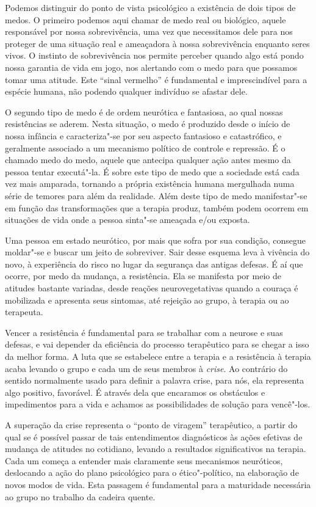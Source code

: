 Podemos distinguir do ponto de vista psicológico a existência de dois
tipos de medos. O primeiro podemos aqui chamar de medo real ou
biológico, aquele responsável por nossa sobrevivência, uma vez que
necessitamos dele para nos proteger de uma situação real e ameaçadora à
nossa sobrevivência enquanto seres vivos. O instinto de sobrevivência
nos permite perceber quando algo está pondo nossa garantia de vida em
jogo, nos alertando com o medo para que possamos tomar uma atitude. Este
``sinal vermelho'' é fundamental e imprescindível para a espécie humana,
não podendo qualquer indivíduo se afastar dele.

O segundo tipo de medo é de ordem neurótica e fantasiosa, ao qual nossas
resistências se aderem. Nesta situação, o medo é produzido desde o
início de nossa infância e caracteriza"-se por seu aspecto fantasioso e
catastrófico, e geralmente associado a um mecanismo político de controle
e repressão. É o chamado medo do medo, aquele que antecipa qualquer ação
antes mesmo da pessoa tentar executá"-la. É sobre este tipo de medo que a
sociedade está cada vez mais amparada, tornando a própria existência
humana mergulhada numa série de temores para além da realidade. Além
deste tipo de medo manifestar"-se em função das transformações que a
terapia produz, também podem ocorrem em situações de vida onde a pessoa
sinta"-se ameaçada e/ou exposta.

Uma pessoa em estado neurótico, por mais que sofra por sua condição,
consegue moldar"-se e buscar um jeito de sobreviver. Sair desse esquema
leva à vivência do novo, à experiência do risco no lugar da segurança
das antigas defesas. É aí que ocorre, por medo da mudança, a
resistência. Ela se manifesta por meio de atitudes bastante variadas,
desde reações neurovegetativas quando a couraça é mobilizada e apresenta
seus sintomas, até rejeição ao grupo, à terapia ou ao terapeuta.

Vencer a resistência é fundamental para se trabalhar com a neurose e
suas defesas, e vai depender da eficiência do processo terapêutico para
se chegar a isso da melhor forma. A luta que se estabelece entre a terapia
e a resistência à terapia acaba levando o grupo e cada um de seus
membros à \emph{crise}. Ao contrário do sentido normalmente usado para
definir a palavra crise, para nós, ela representa algo positivo,
favorável. É através dela que encaramos os obstáculos e impedimentos
para a vida e achamos as possibilidades de solução para vencê"-los.

A superação da crise representa o ``ponto de viragem'' terapêutico, a
partir do qual se é possível passar de tais entendimentos
diagnósticos às ações efetivas de mudança de atitudes no cotidiano,
levando a resultados significativos na terapia. Cada um começa a
entender mais claramente seus mecanismos neuróticos, deslocando a ação
do plano psicológico para o ético"-político, na elaboração de novos modos
de vida. Esta passagem é fundamental para a maturidade necessária ao
grupo no trabalho da cadeira quente.

